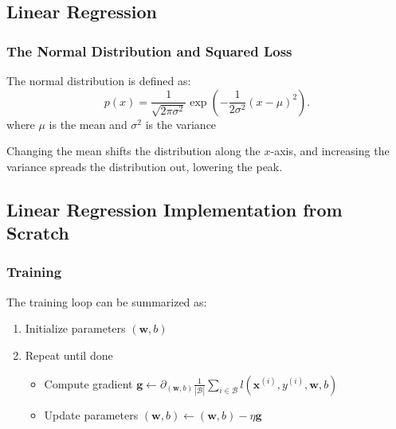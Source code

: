 \documentclass[]{article}
\begin{document}
\subsection{Linear Regression}
\setcounter{subsubsection}{2}
\subsubsection{The Normal Distribution and Squared Loss}

The normal distribution is defined as:
\begin{equation}
    p(x) = \frac{1}{\sqrt{2 \pi \sigma^2}} \exp\left(-\frac{1}{2 \sigma^2} (x - \mu)^2\right).
    \tag{3.1.12}
\end{equation}
where $\mu$ is the mean and $\sigma^2$ is the variance

Changing the mean shifts the distribution along the $x$-axis, and increasing the
variance spreads the distribution out, lowering the peak.

\setcounter{subsection}{3}
\subsection{Linear Regression Implementation from Scratch}
\setcounter{subsubsection}{3}
\subsubsection{Training}
The training loop can be summarized as:
\begin{enumerate}
    \item Initialize parameters $(\mathbf{w},b)$
    \item Repeat until done
    \begin{itemize}
        \item Compute gradient $\mathbf{g} \leftarrow \partial_{(\mathbf{w},b)} \frac{1}{|\mathcal{B}|} \sum_{i \in \mathcal{B}} l(\mathbf{x}^{(i)}, y^{(i)}, \mathbf{w}, b)$
        \item Update parameters $(\mathbf{w}, b) \leftarrow (\mathbf{w}, b) - \eta \mathbf{g}$
    \end{itemize}
\end{enumerate}


\end{document}
